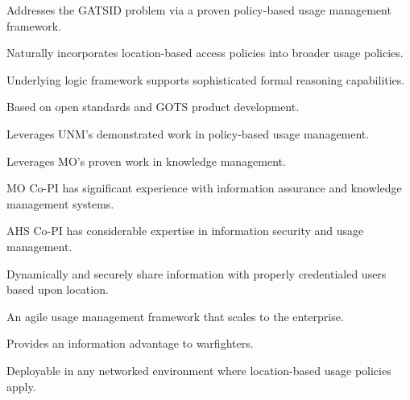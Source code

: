 \documentclass{sbir}
\begin{document}
\begin{evalbox}
  \begin{evalitemize}
     \item Addresses the GATSID problem via a proven policy-based usage management framework.
     \item Naturally incorporates location-based access policies into broader usage policies.
     \item Underlying logic framework supports sophisticated formal reasoning capabilities.
  \end{evalitemize}
  \begin{evalitemize}
     \item Based on open standards and GOTS product development.
     \item Leverages UNM's demonstrated work in policy-based usage management.
     \item Leverages MO's proven work in knowledge management.
  \end{evalitemize}
  \begin{evalitemize}
     \item MO Co-PI has significant experience with information assurance and knowledge management systems.
     \item AHS Co-PI has considerable expertise in information security and usage management.
  \end{evalitemize}
  \begin{evalitemize}
     \item Dynamically and securely share information with properly credentialed users based upon location.
     \item An agile usage management framework that scales to the enterprise.
     \item Provides an information advantage to warfighters.
  \end{evalitemize}
  \begin{evalitemize}
     \item Deployable in any networked environment where location-based usage policies apply.
  \end{evalitemize}
\end{evalbox}
\end{document}
